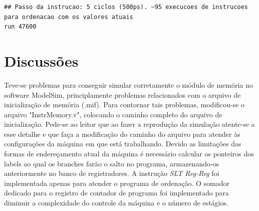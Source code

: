 \documentclass[11pt,a4paper,titlepage]{article}
\begin{document}
\begin{lstlisting}
## Passo da instrucao: 5 ciclos (500ps). ~95 execucoes de instrucoes para ordenacao com os valores atuais
run 47600
\end{lstlisting}

\section{Discussões}

Teve-se problemas para conseguir simular corretamente o módulo de memória no software ModelSim, principlamente problemas relacionados com o arquivo de inicialização de memória (.mif). Para contornar tais problemas, modificou-se o arquivo "InstrMemory.v", colocando o caminho completo do arquivo de inicialização. Pede-se ao leitor que ao fazer a reprodução da simulação atente-se a esse detalhe e que faça a modificação do caminho do arquivo para atender às configurações da máquina em que está trabalhando.
Devido as limitações das formas de endereçamento atual da máquina é necessário calcular os ponteiros dos labels ao qual os branches farão o salto no programa, armazenando-os anteriormente no banco de registradores.
A instrução \textit{SLT Reg-Reg} foi implementada apenas para atender o programa de ordenação. O somador dedicado para o registro de contador de programa foi implementado para diminuir a complexidade do controle da máquina e o número de estágios.



%

\nocite{*}
\end{document}

